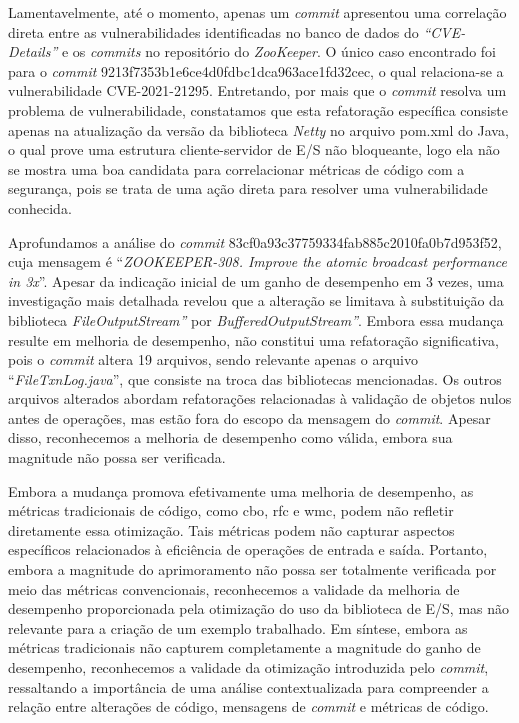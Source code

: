 Lamentavelmente, até o momento, apenas um \textit{commit} apresentou uma correlação direta entre as vulnerabilidades identificadas no banco de dados do \textit{``CVE-Details''} e os \textit{commits} no repositório do \textit{ZooKeeper}. O único caso encontrado foi para o \textit{commit} 9213f7353b1e6ce4d0fdbc1dca963ace1fd32cec, o qual relaciona-se a vulnerabilidade CVE-2021-21295. Entretando, por mais que o \textit{commit} resolva um problema de vulnerabilidade, constatamos que esta refatoração específica consiste apenas na atualização da versão da biblioteca \textit{Netty} no arquivo pom.xml do Java, o qual prove uma estrutura cliente-servidor de E/S não bloqueante, logo ela não se mostra uma boa candidata para correlacionar métricas de código com a segurança, pois se trata de uma ação direta para resolver uma vulnerabilidade conhecida.

Aprofundamos a análise do \textit{commit} 83cf0a93c37759334fab885c2010fa0b7d953f52, cuja mensagem é ``\textit{ZOOKEEPER-308. Improve the atomic broadcast performance in 3x}''. Apesar da indicação inicial de um ganho de desempenho em 3 vezes, uma investigação mais detalhada revelou que a alteração se limitava à substituição da biblioteca \textit{FileOutputStream''} por \textit{BufferedOutputStream''}. Embora essa mudança resulte em melhoria de desempenho, não constitui uma refatoração significativa, pois o \textit{commit} altera 19 arquivos, sendo relevante apenas o arquivo ``\textit{FileTxnLog.java}'', que consiste na troca das bibliotecas mencionadas. Os outros arquivos alterados abordam refatorações relacionadas à validação de objetos nulos antes de operações, mas estão fora do escopo da mensagem do \textit{commit}. Apesar disso, reconhecemos a melhoria de desempenho como válida, embora sua magnitude não possa ser verificada.

Embora a mudança promova efetivamente uma melhoria de desempenho, as métricas tradicionais de código, como \gls{cbo}, \gls{rfc} e \gls{wmc}, podem não refletir diretamente essa otimização. Tais métricas podem não capturar aspectos específicos relacionados à eficiência de operações de entrada e saída. Portanto, embora a magnitude do aprimoramento não possa ser totalmente verificada por meio das métricas convencionais, reconhecemos a validade da melhoria de desempenho proporcionada pela otimização do uso da biblioteca de E/S, mas não relevante para a criação de um exemplo trabalhado. Em síntese, embora as métricas tradicionais não capturem completamente a magnitude do ganho de desempenho, reconhecemos a validade da otimização introduzida pelo \textit{commit}, ressaltando a importância de uma análise contextualizada para compreender a relação entre alterações de código, mensagens de \textit{commit} e métricas de código.

